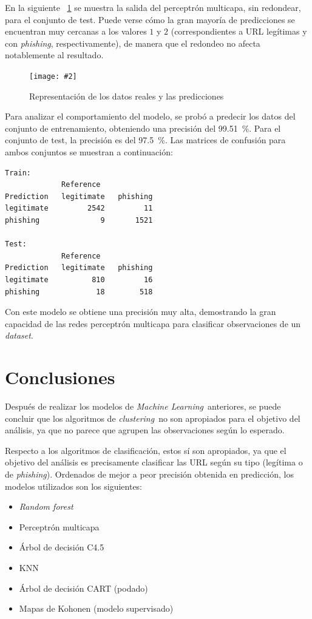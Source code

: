 \documentclass[12pt, a4paper]{article}
\renewcommand{\textit}{\textsl}
\newcommand*{\figref}[1]{\figurename~\ref{fig:#1}}
\newcommand{\figcaption}[4][H]{
  \begin{figure}[#1]
    \centering
    \texttt{[image: \#2]}
    \caption{#3}
    \label{fig:#2}
  \end{figure}
}
\newcommand*{\clustering}{\textit{clustering}}
\newcommand*{\dataset}{\textit{dataset}}
\newcommand*{\ML}{\textit{Machine Learning}}
\newcommand*{\phishing}{\textit{phishing}}
\begin{document}
    En la siguiente \figref{nn_test.png} se muestra la salida del perceptrón multicapa, sin redondear, para el conjunto de test. Puede verse cómo la gran mayoría de predicciones se encuentran muy cercanas a los valores $1$ y $2$ (correspondientes a URL legítimas y con \phishing, respectivamente), de manera que el redondeo no afecta notablemente al resultado.

    \figcaption{nn_test.png}{Representación de los datos reales y las predicciones}{1}

    Para analizar el comportamiento del modelo, se probó a predecir los datos del conjunto de entrenamiento, obteniendo una precisión del \SI{99.51}{\percent}. Para el conjunto de test, la precisión es del \SI{97.5}{\percent}. Las matrices de confusión para ambos conjuntos se muestran a continuación:

    \begin{verbatim}
Train:
             Reference
Prediction   legitimate   phishing
legitimate         2542         11
phishing              9       1521

Test:
             Reference
Prediction   legitimate   phishing
legitimate          810         16
phishing             18        518
      \end{verbatim}

      Con este modelo se obtiene una precisión muy alta, demostrando la gran capacidad de las redes perceptrón multicapa para clasificar observaciones de un \dataset.

  \newpage
  \section*{Conclusiones}

    Después de realizar los modelos de \ML\ anteriores, se puede concluir que los algoritmos de \clustering\ no son apropiados para el objetivo del análisis, ya que no parece que agrupen las observaciones según lo esperado.

    Respecto a los algoritmos de clasificación, estos sí son apropiados, ya que el objetivo del análisis es precisamente clasificar las URL según su tipo (legítima o de \phishing). Ordenados de mejor a peor precisión obtenida en predicción, los modelos utilizados son los siguientes:

    \begin{itemize}
      \item \textit{Random forest}
      \item Perceptrón multicapa
      \item Árbol de decisión C4.5
      \item KNN
      \item Árbol de decisión CART (podado)
      \item Mapas de Kohonen (modelo supervisado)
    \end{itemize}
\end{document}
